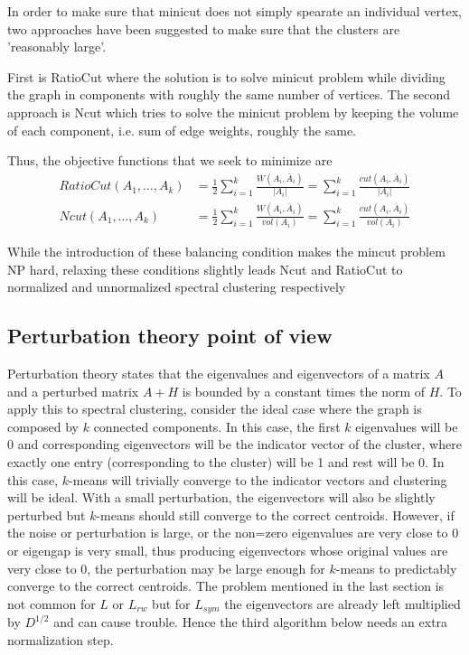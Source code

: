 \documentclass[10pt,a4paper, nocenter]{report}
\begin{document}
        In order to make sure that minicut does not simply spearate an individual vertex, two approaches have been suggested to make sure that the clusters are 'reasonably large'. 

        First is RatioCut \cite{hagen-kahng-1992} where the solution is to solve minicut problem while dividing the graph in components with roughly the same number of vertices. The second approach is Ncut \cite{Shi-Malik-maxcut-00} which tries to solve the minicut problem by keeping the volume of each component, i.e. sum of edge weights, roughly the same.
        
        Thus, the objective functions that we seek to minimize are
        \begin{align*}
            RatioCut(A_{1},\dots,A_{k}) &= \frac{1}{2} \sum_{i=1}^{k}\frac{W(A_{i},\bar{A}_{i})}{\lvert A_{i} \rvert}
            = \sum_{i=1}^{k}\frac{cut(A_{i},\bar{A}_{i})}{\lvert A_{i} \rvert} \\
            Ncut(A_{1},\dots,A_{k}) &= \frac{1}{2}\sum_{i=1}^{k}\frac{W(A_{i},\bar{A}_{i})}{vol(A_{i})} = 
            \sum_{i=1}^{k}\frac{cut(A_{i},\bar{A}_{i})}{vol(A_{i})}
        \end{align*}
    
        While the introduction of these balancing condition makes the mincut problem NP hard, relaxing these conditions slightly leads Ncut and RatioCut to normalized and unnormalized spectral clustering respectively \cite{Luxburg2007}

    \subsection{Perturbation theory point of view}
        Perturbation theory states that the eigenvalues and eigenvectors of a matrix $A$ and a perturbed matrix $A+H$ is bounded by a constant times the norm of $H$. To apply this to spectral clustering, consider the ideal case where the graph is composed by $k$  connected components. In this case, the first $k$ eigenvalues will be 0 and corresponding eigenvectors will be the indicator vector of the cluster, where exactly one entry (corresponding to the cluster) will be 1 and rest will be 0. In this case, $k$-means will trivially converge to the indicator vectors and clustering will be ideal. With a small perturbation, the eigenvectors will also be slightly perturbed but $k$-means should still converge to the correct centroids. However, if the noise or perturbation is large, or the non=zero eigenvalues are very close to 0 or eigengap is very small, thus producing eigenvectors whose original values are very close to 0, the perturbation may be large enough for $k$-means to predictably converge to the correct centroids. The problem mentioned in the last section is not common for $L$ or $L_{rw}$ but for $L_{sym}$ the eigenvectors are already left multiplied by $D^{1/2}$ and can cause trouble. Hence the third algorithm below \cite{ng-jordan-01} needs an extra normalization step. 
\end{document}
